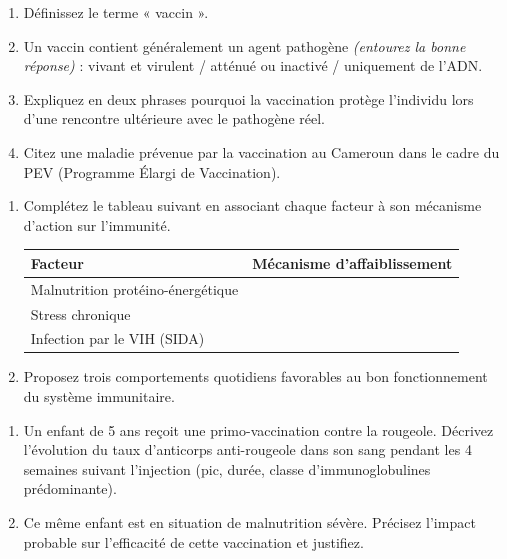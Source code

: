 \documentclass[11pt]{article}
\begin{document}
\begin{exercice}
\begin{enumerate}
    \item Définissez le terme « vaccin ».
    \item Un vaccin contient généralement un agent pathogène \textit{(entourez la bonne réponse)} : vivant et virulent / atténué ou inactivé / uniquement de l'ADN.
    \item Expliquez en deux phrases pourquoi la vaccination protège l'individu lors d'une rencontre ultérieure avec le pathogène réel.
    \item Citez une maladie prévenue par la vaccination au Cameroun dans le cadre du PEV (Programme Élargi de Vaccination).
\end{enumerate}
\end{exercice}

\begin{exercice}
\begin{enumerate}
    \item Complétez le tableau suivant en associant chaque facteur à son mécanisme d'action sur l'immunité.
    \begin{tabular}{|p{3.5cm}|p{11cm}|}
    \hline
    \textbf{Facteur} & \textbf{Mécanisme d'affaiblissement} \\ \hline
    Malnutrition protéino-énergétique &  \\ \hline
    Stress chronique &  \\ \hline
    Infection par le VIH (SIDA) &  \\ \hline
    \end{tabular}
    \item Proposez trois comportements quotidiens favorables au bon fonctionnement du système immunitaire.
\end{enumerate}
\end{exercice}

\begin{exercice}
\begin{enumerate}
    \item Un enfant de 5 ans reçoit une primo-vaccination contre la rougeole. Décrivez l'évolution du taux d'anticorps anti-rougeole dans son sang pendant les 4 semaines suivant l'injection (pic, durée, classe d'immunoglobulines prédominante).
    \item Ce même enfant est en situation de malnutrition sévère. Précisez l'impact probable sur l'efficacité de cette vaccination et justifiez.
\end{enumerate}
\end{exercice}
\end{document}
